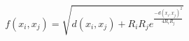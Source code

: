 \begin{equation}
f(x_i,x_j) = \sqrt{
                    d(x_i,x_j) +
                    R_i R_j e^{\frac{-d(x_i,x_j)^2}{4 R_i R_j}}
                  }
\end{equation}
